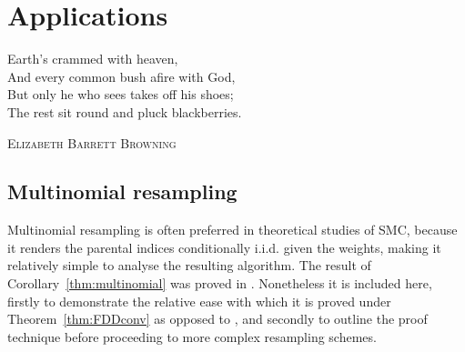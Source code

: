 \chapter{Applications}\label{ch:appl}

\epigraph{
Earth's crammed with heaven, \\
And every common bush afire with God, \\
But only he who sees takes off his shoes; \\
The rest sit round and pluck blackberries.
}
{\textsc{Elizabeth Barrett Browning}}


\section{Multinomial resampling \seb{$\checkmark$} }
Multinomial resampling is often preferred in theoretical studies of SMC, because it renders the parental indices conditionally i.i.d. given the weights, making it relatively simple to analyse the resulting algorithm.
The result of Corollary~\ref{thm:multinomial} was proved in \textcite[Corollary 1]{koskela2018}. Nonetheless it is included here, firstly to demonstrate the relative ease with which it is proved under Theorem~\ref{thm:FDDconv} as opposed to \textcite[Theorem 1]{koskela2018}, and secondly to outline the proof technique before proceeding to more complex resampling schemes.

